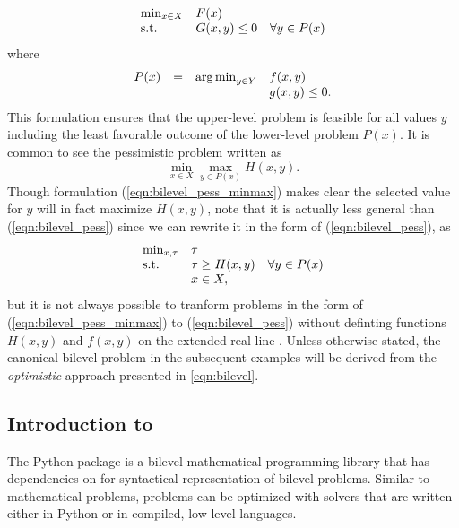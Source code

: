 \begin{equation}
\label{eqn:bilevel_pess}
\begin{array}{lll}
\min_{x \in X}   & F(x)\\
\textrm{s.t.}                 & G(x,y) \leq 0 &\forall y \in P(x)
\end{array}
\end{equation}
where 
\[
\begin{array}{llll}
P(x) & = & \operatorname*{arg\,min}_{y \in Y}    & f(x,y)\\
 & &                            & g(x,y) \leq 0.
\end{array}
\]
This formulation ensures that the upper-level problem is feasible for all values $y$ including the least favorable outcome of the lower-level problem $P(x)$. 
It is common to see the pessimistic problem written as
\begin{equation}
\label{eqn:bilevel_pess_minmax}
\min_{x \in X}\max_{y \in P(x)} H(x,y).
\end{equation}
Though formulation (\ref{eqn:bilevel_pess_minmax}) makes clear the selected value for $y$ will in fact maximize $H(x,y)$, note that it is actually less general than (\ref{eqn:bilevel_pess}) since we can rewrite it in the form of (\ref{eqn:bilevel_pess}), as
\[
\begin{array}{lll}
\min_{x, \tau} &\tau \\
\textrm{s.t.} & \tau \geq H(x, y) & \forall y \in P(x) \\
& x \in X,
\end{array}
\]
but it is not always possible to tranform problems in the form of (\ref{eqn:bilevel_pess_minmax}) to (\ref{eqn:bilevel_pess}) without definting functions $H(x,y)$ and $f(x,y)$ on the extended real line \cite{WiesemannTKR2013}.
Unless otherwise stated, the canonical bilevel problem in the subsequent examples will be derived from the \textit{optimistic} approach presented in \eqref{eqn:bilevel}.


\subsection{Introduction to }

The Python package  is a bilevel mathematical programming library that has dependencies on  for syntactical representation of bilevel problems. Similar to  mathematical problems,  problems can be optimized with solvers that are written either in Python or in compiled, low-level languages.


